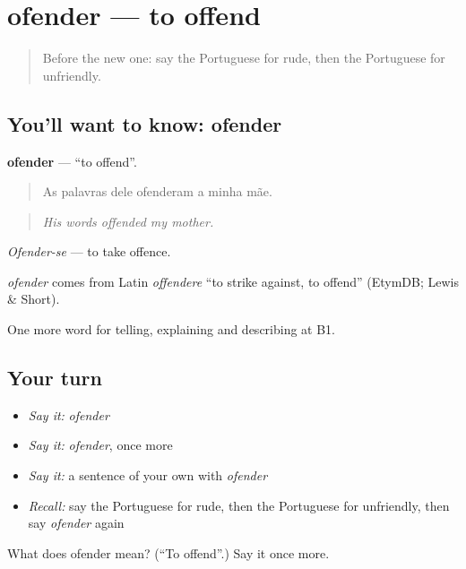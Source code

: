 \section[ofender]{ofender — to offend}

\label{lesson:PT-C473-ofender}



\begin{quote}
Before the new one: say the Portuguese for rude, then the Portuguese for unfriendly.
\end{quote}

\subsection*{You'll want to know: ofender}
\textbf{ofender} — \textquotedblleft{}to offend\textquotedblright{}.

\begin{quote}
As palavras dele ofenderam a minha mãe.
\end{quote}

\begin{quote}
\emph{His words offended my mother.}
\end{quote}

\emph{Ofender-se} — to take offence.

\begin{cousinweb}
\emph{ofender} comes from Latin \emph{offendere} \textquotedblleft{}to strike against, to offend\textquotedblright{} (EtymDB; Lewis \& Short).
\end{cousinweb}

\begin{grammarlens}[title={What you've built}]
One more word for telling, explaining and describing at B1.
\end{grammarlens}

\subsection*{Your turn}
\begin{itemize}
\raggedright
  \item \emph{Say it:} \emph{ofender}
  \item \emph{Say it:} \emph{ofender}, once more
  \item \emph{Say it:} a sentence of your own with \emph{ofender}
  \item \emph{Recall:} say the Portuguese for rude, then the Portuguese for unfriendly, then say \emph{ofender} again
\end{itemize}

\begin{tcolorbox}[breakable,colback=teal!4,colframe=teal!35!black,title={Before you move on}]
What does ofender mean? (\textquotedblleft{}To offend\textquotedblright{}.) Say it once more.
\end{tcolorbox}
